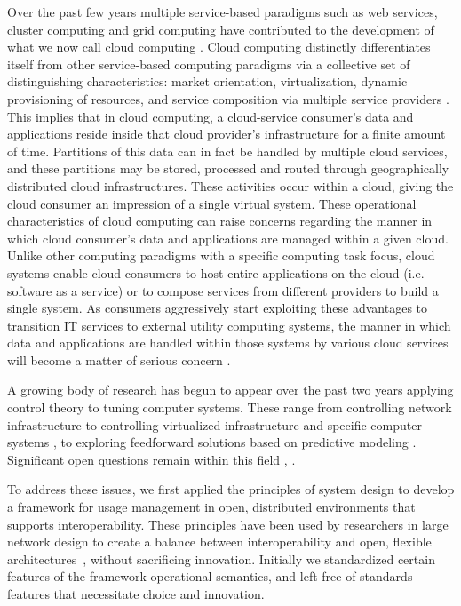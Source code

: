\documentclass{acm_proc_article-sp}
\begin{document}
Over the past few years multiple service-based paradigms such as web services, cluster computing and grid computing have contributed to the development of what we now call cloud computing \cite{Bu:09}. Cloud computing distinctly differentiates itself from other service-based computing paradigms via a collective set of distinguishing characteristics:  market orientation, virtualization, dynamic provisioning of resources, and service composition via multiple service providers \cite{BuYeVeBrBr:09}. This implies that in cloud computing, a cloud-service consumer's data and applications reside inside that cloud provider's infrastructure for a finite amount of time.  Partitions of this data can in fact be handled by multiple cloud services, and these partitions may be stored, processed and routed through geographically distributed cloud infrastructures. These activities occur within a cloud, giving the cloud consumer an impression of a single virtual system.  These operational characteristics of cloud computing can 
raise concerns regarding the manner in which cloud consumer's data and applications are managed within a given cloud. Unlike other computing paradigms with a specific computing task focus, cloud systems enable cloud consumers to host entire applications on the cloud (i.e. software as a service) or to compose services from different providers to build a single system. As consumers aggressively start exploiting these advantages to transition IT services to external utility computing systems, the manner in which data and applications are handled within those systems by various cloud services will become a matter of serious concern \cite{Jamkhedkar:2010:IUM:1866870.1866885}.

A growing body of research has begun to appear over the past two years applying control theory to tuning computer systems.  These range from controlling network infrastructure \cite{ctrl:ariba-GL:2009} to controlling virtualized infrastructure and specific computer systems \cite{ctrl:wang-cgswrzh:2009}, \cite{ctrl:kjaer-kr:2009} to exploring feedforward solutions based on predictive modeling \cite{ctrl:abdelwahed-bsk:2009}.  Significant open questions remain within this field \cite{ctrl:Zhu:2009:CTB:1496909.1496922}, \cite{ctrl:hellerstein-sw:2009}.

To address these issues, we first applied the principles of system design to develop a framework for usage management in open, distributed environments that supports interoperability. These principles have been used by researchers in large network design to create a balance between interoperability and open, flexible architectures~\cite{Al:04,BlCl:01,ClWrSoBr:02}, without sacrificing innovation. Initially we standardized certain features of the framework operational semantics, and left free of standards features that necessitate choice and innovation.
\end{document}
